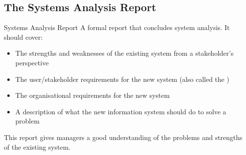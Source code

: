 \documentclass[\main/notes.tex]{subfiles}
\begin{document}
			\subsection{The Systems Analysis Report}
				\begin{definition}{Systems Analysis Report}
					A formal report that concludes system analysis. It should cover:
					\begin{itemize}[nosep]
						\item The strengths and weaknesses of the existing system from a stakeholder's perspective
						\item The user/stakeholder requirements for the new system (also called the )
						\item The organisational requirements for the new system
						\item A description of what the new information system should do to solve a problem
					\end{itemize}
					This report gives managers a good understanding of the problems and strengths of the existing system.
				\end{definition}

		\pagebreak
\end{document}

